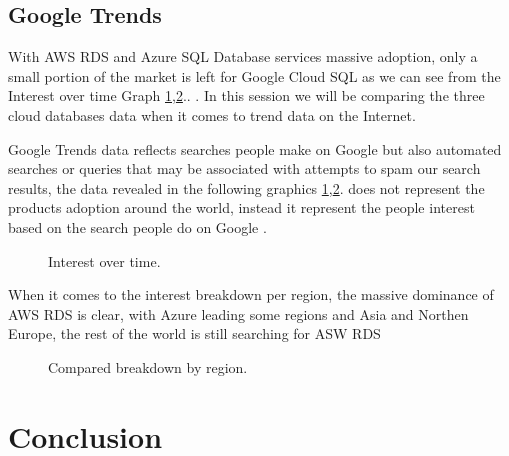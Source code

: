 \documentclass{article}
\begin{document}
\subsection{Google Trends}

With AWS RDS and Azure SQL Database services massive adoption, \cite{GoogleTrends} only a small portion of the market is left for Google Cloud SQL as we can see from the Interest over time Graph \ref{fig:Interest},\ref{fig:Compared}.. \cite{GoogleTrends}. In this session we will be comparing the three cloud databases data when it comes to trend data on the Internet. 

Google Trends data reflects searches people make on Google but also automated searches or queries that may be associated with attempts to spam our search results, the data revealed in the following graphics \ref{fig:Interest},\ref{fig:Compared}. \cite{GoogleTrends} does not represent the products adoption around the world, instead it represent the people interest based on the search people do on Google \cite{GoogleTrends}. 

\begin{figure}[hbt!]
\centering
\caption{\label{fig:Interest} Interest over time.}
\end{figure}

When it comes to the interest breakdown per region, the massive dominance of AWS RDS is clear, with Azure leading some regions and Asia and Northen Europe, the rest of the world is still searching for ASW RDS 
\begin{figure}[hbt!]
\centering
\caption{\label{fig:Compared} Compared breakdown by region.}
\end{figure}

\section{Conclusion}
\clearpage


\end{document}
